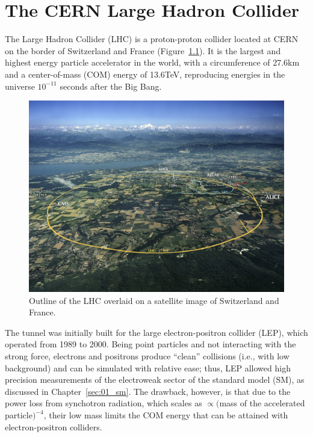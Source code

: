 \chapter{The CERN Large Hadron Collider}
\label{sec:02_lhc}

The Large Hadron Collider (LHC) is a proton-proton collider located at CERN on the border of Switzerland and France (Figure~\ref{fig:02_lhc_geneva}).
It is the largest and highest energy particle accelerator in the world, with a circumference of 27.6\unit{km} and a center-of-mass (COM) energy of 13.6\unit{TeV}, reproducing energies in the universe $10^{-11}$ seconds after the Big Bang.

\begin{figure}[ht]
    \centering
    \includegraphics[width=\textwidth]{figures/02-CMS/lhc/lhc_geneva.jpg}
    \caption{Outline of the LHC overlaid on a satellite image of Switzerland and France.}
    \label{fig:02_lhc_geneva}    
\end{figure}

The tunnel was initially built for the large electron-positron collider (LEP), which operated from 1989 to 2000.
Being point particles and not interacting with the strong force, electrons and positrons produce ``clean'' collisions (i.e., with low background) and can be simulated with relative ease; thus, LEP allowed high precision measurements of the electroweak sector of the standard model (SM), as discussed in Chapter~\ref{sec:01_sm}.
The drawback, however, is that due to the power loss from synchotron radiation, which scales as $\propto ($mass of the accelerated particle$)^{-4}$, their low mass limits the COM energy that can be attained with electron-positron colliders.

